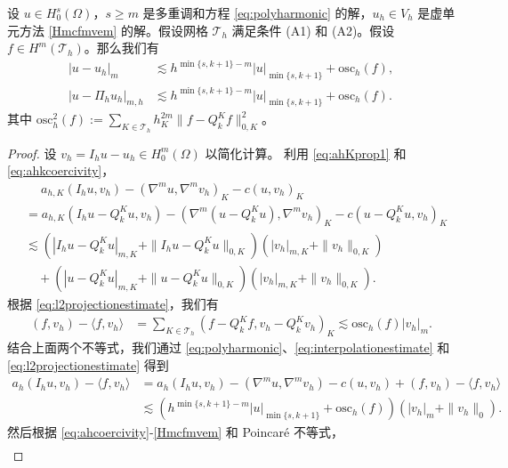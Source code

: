 \begin{theorem}
\label{errorestimate}
设 $u\in H_0^s(\Omega)$，$s\geq m$ 是多重调和方程 \eqref{eq:polyharmonic}
的解，$u_h\in V_h$ 是虚单元方法 \eqref{Hmcfmvem} 的解。假设网格 $\mathcal T_h$ 满足条件 (A1) 和 (A2)。假设
$f\in H^m(\mathcal T_h)$。那么我们有
\begin{align}
\label{eq:uherrorestimate}
|u-u_h|_m &\lesssim h^{\min\{s,k+1\}-m}|u|_{\min\{s,k+1\}}+\textrm{osc}_h(f), \\
\label{eq:pihuherrorestimate}
|u-\Pi_hu_h|_{m,h} &\lesssim
h^{\min\{s,k+1\}-m}|u|_{\min\{s,k+1\}}+\textrm{osc}_h(f).
\end{align}
其中 $\textrm{osc}_h^2(f):=\sum\limits_{K\in\mathcal T_h}h_K^{2m}\|f-Q_k^Kf\|_{0,K}^2$。
\end{theorem}
\begin{proof}
设 $v_h=I_hu-u_h\in H_0^m(\Omega)$ 以简化计算。
利用 \eqref{eq:ahKprop1} 和 \eqref{eq:ahkcoercivity}，
\begin{align*}
&\quad \; a_{h,K}(I_hu, v_h) - (\nabla^mu, \nabla^mv_h)_K-c(u, v_h)_K \\
& =a_{h,K}(I_hu-Q_k^Ku, v_h) - (\nabla^m(u-Q_k^Ku), \nabla^mv_h)_K-c(u-Q_k^Ku, v_h)_K \\
&\lesssim (|I_hu-Q_k^Ku|_{m,K}+\|I_hu-Q_k^Ku\|_{0,K})(|v_h|_{m,K}+\|v_h\|_{0,K}) \\
&\quad +(|u-Q_k^Ku|_{m,K}+\|u-Q_k^Ku\|_{0,K})(|v_h|_{m,K}+\|v_h\|_{0,K}).
\end{align*}
根据 \eqref{eq:l2projectionestimate}，我们有
\begin{align*}
(f, v_h)-\langle f, v_h\rangle&=\sum_{K\in\mathcal T_h}(f-Q_k^Kf,
v_h-Q_k^Kv_h)_K \lesssim \textrm{osc}_h(f)|v_h|_{m}.
\end{align*}
结合上面两个不等式，我们通过 \eqref{eq:polyharmonic}、\eqref{eq:interpolationestimate} 和 \eqref{eq:l2projectionestimate} 得到
\begin{align*}
a_h(I_hu, v_h)-\langle f, v_h\rangle 
&= a_h(I_hu, v_h) - (\nabla^mu, \nabla^mv_h)-c(u, v_h)+(f, v_h)-\langle f, v_h\rangle \\
&\lesssim
(h^{\min\{s,k+1\}-m}|u|_{\min\{s,k+1\}}+\textrm{osc}_h(f))(|v_h|_{m}+\|v_h\|_{0}).
\end{align*} 
然后根据 \eqref{eq:ahcoercivity}-\eqref{Hmcfmvem} 和 Poincar\'e 不等式，
\begin{align*}

\end{align*}
\end{proof}
